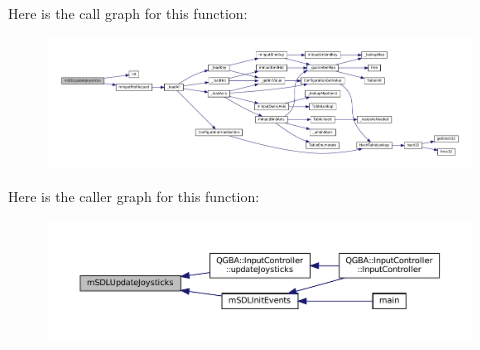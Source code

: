 Here is the call graph for this function\+:
\nopagebreak
\begin{figure}[H]
\begin{center}
\leavevmode
\includegraphics[width=350pt]{sdl-events_8c_aff18d01c9bc92cc366bd2dd53984420a_cgraph}
\end{center}
\end{figure}
Here is the caller graph for this function\+:
\nopagebreak
\begin{figure}[H]
\begin{center}
\leavevmode
\includegraphics[width=350pt]{sdl-events_8c_aff18d01c9bc92cc366bd2dd53984420a_icgraph}
\end{center}
\end{figure}
